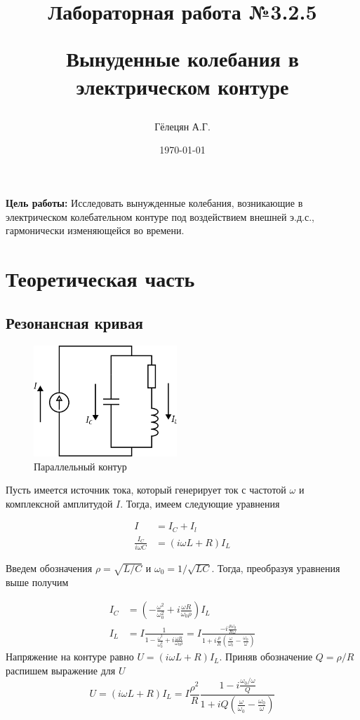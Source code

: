 \documentclass{article}
\title{\begin{center}Лабораторная работа №3.2.5\end{center}
Вынуденные колебания в электрическом контуре}
\author{Гёлецян А.Г.}
\date{\today}
\begin{document}
\maketitle
\newpage
{}

\textbf{Цель работы:} Исследовать вынужденные колебания, возникающие в электрическом
колебательном контуре под воздействием внешней э.д.с., гармонически изменяющейся во
времени.

\section{Теоретическая часть}\label{theory}
\subsection{Резонансная кривая}\label{theory_achx}
\vspace{0.5cm}
\begin{figure}
  \begin{center}
    \includegraphics[width=0.48\textwidth]{sxema.png}
  \end{center}
  \caption{Параллельный контур}\label{fig:sxema}
\end{figure}

Пусть имеется источник тока, который генерирует ток с частотой $\omega$ и комплексной
амплитудой $I$. Тогда, имеем следующие уравнения

\begin{align*}
    I &= I_C + I_l \\
    \frac{I_C}{i\omega C} &= (i\omega L + R) I_L
\end{align*}

Введем обозначения $\rho=\sqrt{L/C}$ и $\omega_0=1/\sqrt{LC}$. Тогда, преобразуя уравнения выше получим

\begin{align*}
    I_C &= \left(-\frac{\omega^2}{\omega^2_0} +i\frac{\omega R}{\omega_0\rho}\right)I_L\\
    I_L &= I\frac{1}{1-\frac{\omega^2}{\omega_0^2} + i \frac{\omega R}{\omega_0 \rho}} = 
        I \frac{-i\frac{\rho\omega_0}{R\omega}}{1+i\frac{\rho}{R}\left(
            \frac{\omega}{\omega_0} - \frac{\omega_0}{\omega}\right)}
\end{align*}
Напряжение на контуре равно $U = (i\omega L + R)I_L$. Приняв обозначение $Q=\rho/R$
распишем выражение для $U$
\begin{equation}
    U = (i\omega L+R)I_L=I\frac{\rho^2}{R}\frac{1 - i\frac{\omega_0/\omega}{Q}}
    {1 + iQ\left(\frac{\omega}{\omega_0} - \frac{\omega_0}{\omega}\right)}
\end{equation}\label{eq:voltage}
\end{document}
